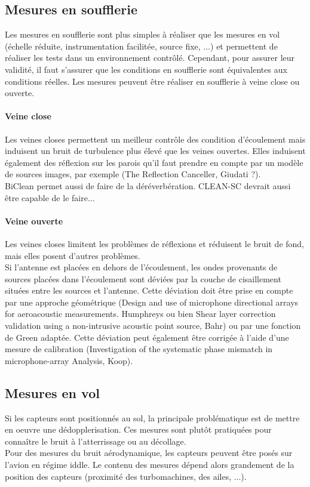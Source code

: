 \subsection{Mesures en soufflerie}
Les mesures en soufflerie sont plus simples à réaliser que les mesures en vol (échelle réduite, instrumentation facilitée, source fixe, ...) et permettent de réaliser les tests dans un environnement contrôlé. Cependant, pour assurer leur validité, il faut s'assurer que les conditions en soufflerie sont équivalentes aux conditions réelles. Les mesures peuvent être réaliser en soufflerie à veine close ou ouverte.
\paragraph{Veine close}
 Les veines closes permettent un meilleur contrôle des condition d'écoulement mais induisent un bruit de turbulence plus élevé que les veines ouvertes. Elles induisent également des réflexion sur les parois qu'il faut prendre en compte par un modèle de sources images, par exemple (The Reflection Canceller, Giudati ?).\\
 BiClean permet aussi de faire de la déréverbération. CLEAN-SC devrait aussi être capable de le faire...
 
 \paragraph{Veine ouverte}
 Les veines closes limitent les problèmes de réflexions et réduisent le bruit de fond, mais elles posent d'autres problèmes.\\
 Si l'antenne est placées en dehors de l'écoulement, les ondes provenants de sources placées dans l'écoulement sont déviées par la couche de cisaillement situées entre les sources et l'antenne. Cette déviation doit être prise en compte par une approche géométrique (Design and use of microphone directional arrays for aeroacoustic measurements. Humphreys ou bien Shear layer correction validation using a non-intrusive acoustic point source, Bahr) ou par une fonction de Green adaptée. Cette déviation peut également être corrigée à l'aide d'une mesure de calibration (Investigation  of  the  systematic  phase  mismatch in  microphone-array  Analysis, Koop).


\subsection{Mesures en vol}
Si les capteurs sont positionnés au sol, la principale problématique est de mettre en oeuvre une dédopplerisation. Ces mesures sont plutôt pratiquées pour connaître le bruit à l’atterrissage ou au décollage.\\
Pour des mesures du bruit aérodynamique, les capteurs peuvent être posés sur l'avion en régime iddle. Le contenu des mesures dépend alors grandement de la position des capteurs (proximité des turbomachines, des ailes, ...).



